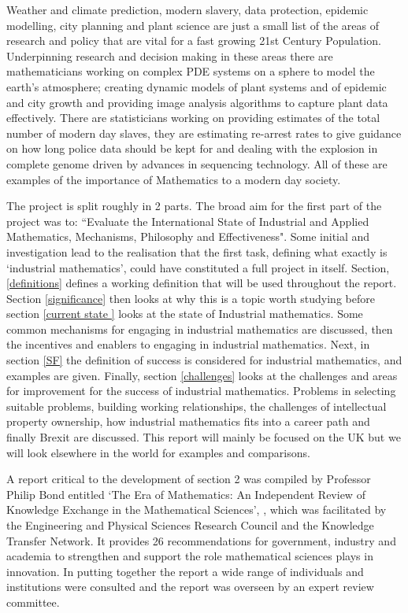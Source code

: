 \documentclass[11pt]{article} %
\begin{document}
	
	Weather and climate prediction, modern slavery, data protection, epidemic modelling, city planning and  plant science are just a small list of the areas of research and policy that are vital for a fast growing 21st Century Population. Underpinning research and decision making in these areas there are mathematicians working on complex PDE systems on a sphere to model the earth's atmosphere; creating dynamic models of plant systems and of epidemic and city growth and  providing image analysis algorithms to capture plant data effectively. There are  statisticians working on providing estimates of the total number of modern day slaves, they are estimating re-arrest rates to give guidance on how long police data should be kept for and dealing with the explosion in complete genome driven by advances in sequencing technology. All of these are examples of the importance of Mathematics to a modern day society.
	 
	
	The project is split roughly in 2 parts. The broad aim for the first part of the project was to: ``Evaluate the  International State of Industrial and Applied Mathematics, Mechanisms, Philosophy and Effectiveness". Some initial and investigation lead to the realisation that the first task, defining what exactly is `industrial mathematics', could have constituted a full project in itself.  Section, \ref{definitions} defines a working definition that will be used throughout the report. 
		Section \ref{significance} then looks at why this is  a topic worth studying before section \ref{current state } looks at the state of Industrial mathematics.  Some common mechanisms for engaging in industrial mathematics are discussed, then the incentives and enablers to engaging in industrial mathematics. Next, in section \ref{SF} the definition of success is considered for industrial mathematics, and examples are given. Finally, section \ref{challenges} looks at the challenges and areas for improvement for the success of industrial mathematics. Problems in selecting suitable problems, building working relationships, the challenges of intellectual property ownership, how industrial mathematics fits into a career path and finally Brexit are discussed. This report will mainly be  focused on the UK but we will look elsewhere in the world for examples and comparisons. 
	
	
	 A report critical to the development of  section 2 was compiled by Professor Philip Bond entitled `The Era of Mathematics: An Independent Review of Knowledge Exchange in the Mathematical Sciences', \cite{Bond}, which was facilitated by the Engineering and Physical Sciences Research Council and the Knowledge Transfer Network. It provides 26 recommendations for government, industry and academia to strengthen and support the role mathematical sciences plays in innovation. In putting together the report a wide range of individuals and institutions were consulted and the report was overseen by an expert review committee. 
	
\end{document}
